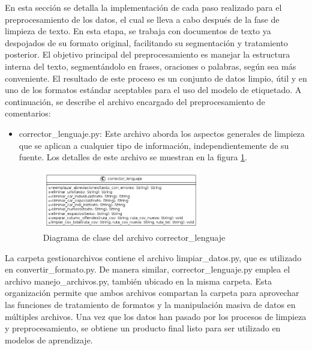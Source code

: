En esta sección se detalla la implementación de cada paso realizado para el preprocesamiento de los datos, el cual se lleva a cabo después de la fase de limpieza de texto. En esta etapa, se trabaja con documentos de texto ya despojados de su formato original, facilitando su segmentación y tratamiento posterior. El objetivo principal del preprocesamiento es manejar la estructura interna del texto, segmentándolo en frases, oraciones o palabras, según sea más conveniente. El resultado de este proceso es un conjunto de datos limpio, útil y en uno de los formatos estándar aceptables para el uso del modelo de etiquetado. A continuación, se describe el archivo encargado del preprocesamiento de comentarios:

\begin{itemize}

\item corrector\_lenguaje.py: Este archivo aborda los aspectos generales de limpieza que se aplican a cualquier tipo de información, independientemente de su fuente. Los detalles de este archivo se muestran en la figura \ref{fig:uml2}.

\begin{figure}
	\includegraphics[width=0.65\textwidth]{capitulo5/figuras/fig2.png}
	\caption{Diagrama de clase del archivo corrector\_lenguaje}
	\label{fig:uml2}
\end{figure}

\end{itemize}

La carpeta gestionarchivos contiene el archivo limpiar\_datos.py, que es utilizado en convertir\_formato.py. De manera similar, corrector\_lenguaje.py emplea el archivo manejo\_archivos.py, también ubicado en la misma carpeta. Esta organización permite que ambos archivos compartan la carpeta para aprovechar las funciones de tratamiento de formatos y la manipulación masiva de datos en múltiples archivos.
Una vez que los datos han pasado por los procesos de limpieza y preprocesamiento, se obtiene un producto final listo para ser utilizado en modelos de aprendizaje.


